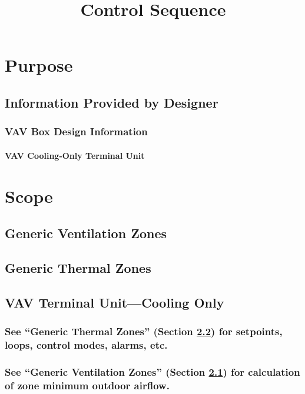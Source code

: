 \documentclass[10pt]{article}
\title{Control Sequence}
\author{}
\date{}
\begin{document}
\maketitle

\newpage

\section{Purpose}
\subsection{Information Provided by Designer}

\subsubsection{VAV Box Design Information}
\paragraph{VAV Cooling-Only Terminal Unit} \label{vav_cooling_only_terminal_unit}

\section{Scope}

\subsection{Generic Ventilation Zones} \label{generic_ventilation_zones}
\subsection{Generic Thermal Zones} \label{generic_thermal_zones}

\subsection{VAV Terminal Unit—Cooling Only}
\subsubsection{See “Generic Thermal Zones” (Section \ref{generic_thermal_zones}) for setpoints, loops, control modes, alarms, etc.}
\subsubsection{See “Generic Ventilation Zones” (Section \ref{generic_ventilation_zones}) for calculation of zone minimum outdoor airflow.}
\end{document}
